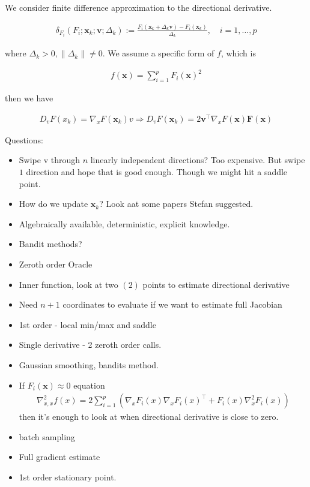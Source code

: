 \documentclass[a4paper, 11pt]{article}
\begin{document}
We consider finite difference approximation to the directional derivative. 

\begin{align}
    \delta_{F_i}(F_i;\mathbf{x}_k; \mathbf{v};\Delta_k):= \frac{F_i(\mathbf{x}_k + \Delta_k \mathbf{v}) - F_i(\mathbf{x}_k)}{\Delta_k}, \quad i = 1, \dots,p 
\end{align}

where $\Delta_k > 0, \| \Delta_k \| \neq 0$. We assume a specific form of $f$, which is 

\begin{align}
    f(\mathbf{x}) = \sum_{i=1}^p F_i(\mathbf{x})^2
\end{align}

then we have 

\begin{align}
    D_vF(x_k) = \nabla_x F(\mathbf{x}_k)v \Rightarrow D_vF(\mathbf{x}_k) = 2\mathbf{v}^\top \nabla_x F(\mathbf{x})\mathbf{F}(\mathbf{x})
\end{align}

Questions: 

\begin{itemize}
    \item Swipe v through $n$ linearly independent directions? Too expensive. But swipe $1$ direction and hope that is good enough. Though we might hit a saddle point. 
    \item How do we update $\mathbf{x}_k$? Look aat some papers Stefan suggested. \item Algebraically available, deterministic, explicit knowledge. 
    \item Bandit methods? 
    \item Zeroth order Oracle 
\end{itemize}

\begin{itemize}
    \item Inner function, look at two $(2)$ points to estimate directional derivative
    \item Need $n+1$ coordinates to evaluate if we want to estimate full Jacobian \item 1st order - local min/max and saddle 
    \item Single derivative - 2 zeroth order calls. 
    \item Gaussian smoothing, bandits method. 
\end{itemize}

\begin{itemize}
    \item If $F_i(\mathbf{x}) \approx 0$ equation 
    \begin{align}
        \nabla_{x,x}^2f(x) = 2\sum_{i=1}^p(\nabla_x F_i(x)\nabla_x F_i(x)^\top + F_i(x)\nabla_x^2 F_i(x))
    \end{align}
    then it's enough to look at when directional derivative is close to zero.
    \item batch sampling 
    \item Full gradient estimate
    \item 1st order stationary point.
\end{itemize}
\end{document}
